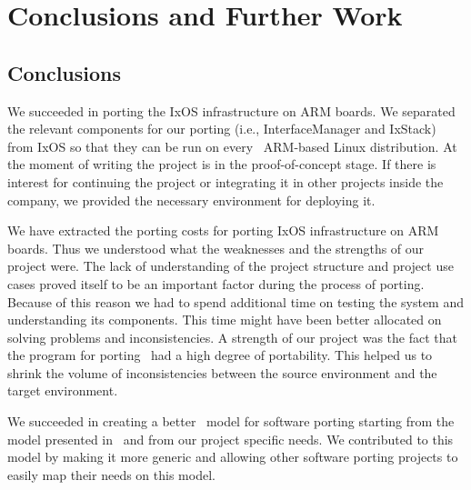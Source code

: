 \chapter{Conclusions and Further Work} \label{sec:conclusions}

\section{Conclusions}


We succeeded in porting the IxOS infrastructure on ARM boards. We separated the
relevant components for our porting (i.e., InterfaceManager and IxStack) from
IxOS so that they can be run on every~ ARM-based Linux distribution. At the
moment of writing the project is in the proof-of-concept stage. If there is
interest for continuing the project or integrating it in other projects inside
the company, we provided the necessary environment for deploying it.~

We have extracted the porting costs for porting IxOS infrastructure on ARM
boards. Thus we understood what the weaknesses and the strengths of our project
were. The lack of understanding of the project structure and project use cases
proved itself to be an important factor during the process of porting. Because
of this reason we had to spend additional time on testing the system and
understanding its components. This time might have been better allocated on
solving problems and inconsistencies. A strength of our project was the fact
that the program for porting~ had a high degree of portability. This helped us to
shrink the volume of inconsistencies between the source environment and the
target environment.

We succeeded in creating a better~ model for software porting starting from the
model presented in~\cite{hakuta,tanaka} and from our project specific needs. We
contributed to this model by making it more generic and allowing other software
porting projects to easily map their needs on this model.~

